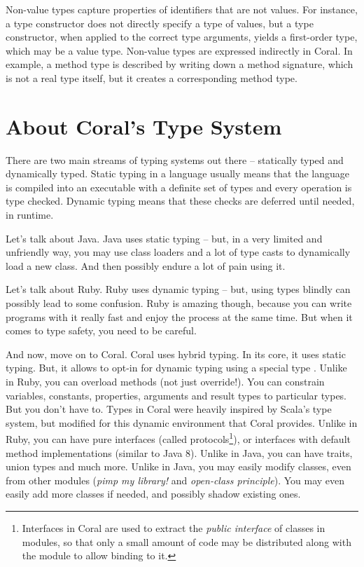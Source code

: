 Non-value types capture properties of identifiers that are not values. For instance, a type constructor does not directly specify a type of values, but a type constructor, when applied to the correct type arguments, yields a first-order type, which may be a value type. Non-value types are expressed indirectly in Coral. In example, a method type is described by writing down a method signature, which is not a real type itself, but it creates a corresponding method type. 






\section{About Coral's Type System}

There are two main streams of typing systems out there -- statically typed and dynamically typed. Static typing in a language usually means that the language is compiled into an executable with a definite set of types and every operation is type checked. Dynamic typing means that these checks are deferred until needed, in runtime. 

Let's talk about Java. Java uses static typing -- but, in a very limited and unfriendly way, you may use class loaders and a lot of type casts to dynamically load a new class. And then possibly endure a lot of pain using it. 

Let's talk about Ruby. Ruby uses dynamic typing -- but, using types blindly can possibly lead to some confusion. Ruby is amazing though, because you can write programs with it really fast and enjoy the process at the same time. But when it comes to type safety, you need to be careful. 

And now, move on to Coral. Coral uses hybrid typing. In its core, it uses static typing. But, it allows to opt-in for dynamic typing using a special type . Unlike in Ruby, you can overload methods (not just override!). You can constrain variables, constants, properties, arguments and result types to particular types. But you don't have to. Types in Coral were heavily inspired by Scala's type system, but modified for this dynamic environment that Coral provides. Unlike in Ruby, you can have pure interfaces (called protocols\footnote{Interfaces in Coral are used to extract the {\em public interface} of classes in modules, so that only a small amount of code may be distributed along with the module to allow binding to it.}), or interfaces with default method implementations (similar to Java 8). Unlike in Java, you can have traits, union types and much more. Unlike in Java, you may easily modify classes, even from other modules ({\em pimp my library!} and {\em open-class principle}). You may even easily add more classes if needed, and possibly shadow existing ones. 

